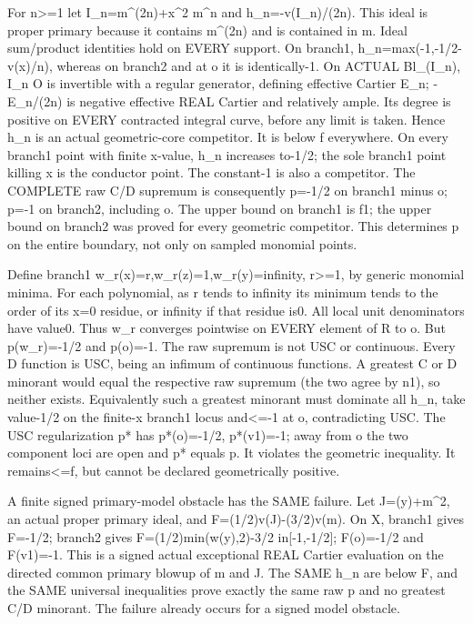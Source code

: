 \documentclass[11pt]{article}
\begin{document}
For n\textgreater{}=1 let I\_n=m\textasciicircum{}(2n)+x\textasciicircum{}2 m\textasciicircum{}n and h\_n=-v(I\_n)/(2n). This ideal is proper primary because it contains m\textasciicircum{}(2n) and is contained in m. Ideal sum/product identities hold on EVERY support. On branch1,
h\_n=max(-1,-1/2-v(x)/n),
whereas on branch2 and at o it is identically-1. On ACTUAL Bl\_(I\_n), I\_n O is invertible with a regular generator, defining effective Cartier E\_n; -E\_n/(2n) is negative effective REAL Cartier and relatively ample. Its degree is positive on EVERY contracted integral curve, before any limit is taken. Hence h\_n is an actual geometric-core competitor. It is below f everywhere. On every branch1 point with finite x-value, h\_n increases to-1/2; the sole branch1 point killing x is the conductor point. The constant-1 is also a competitor. The COMPLETE raw C/D supremum is consequently
p=-1/2 on branch1 minus o; p=-1 on branch2, including o.
The upper bound on branch1 is f1; the upper bound on branch2 was proved for every geometric competitor. This determines p on the entire boundary, not only on sampled monomial points.

Define branch1 w\_r(x)=r,w\_r(z)=1,w\_r(y)=infinity, r\textgreater{}=1, by generic monomial minima. For each polynomial, as r tends to infinity its minimum tends to the order of its x=0 residue, or infinity if that residue is0. All local unit denominators have value0. Thus w\_r converges pointwise on EVERY element of R to o. But p(w\_r)=-1/2 and p(o)=-1. The raw supremum is not USC or continuous. Every D function is USC, being an infimum of continuous functions. A greatest C or D minorant would equal the respective raw supremum (the two agree by n1), so neither exists. Equivalently such a greatest minorant must dominate all h\_n, take value-1/2 on the finite-x branch1 locus and\textless{}=-1 at o, contradicting USC. The USC regularization p* has p*(o)=-1/2, p*(v1)=-1; away from o the two component loci are open and p* equals p. It violates the geometric inequality. It remains\textless{}=f, but cannot be declared geometrically positive.

A finite signed primary-model obstacle has the SAME failure. Let J=(y)+m\textasciicircum{}2, an actual proper primary ideal, and F=(1/2)v(J)-(3/2)v(m). On X, branch1 gives F=-1/2; branch2 gives F=(1/2)min(w(y),2)-3/2 in[-1,-1/2]; F(o)=-1/2 and F(v1)=-1. This is a signed actual exceptional REAL Cartier evaluation on the directed common primary blowup of m and J. The SAME h\_n are below F, and the SAME universal inequalities prove exactly the same raw p and no greatest C/D minorant. The failure already occurs for a signed model obstacle.
\end{document}
